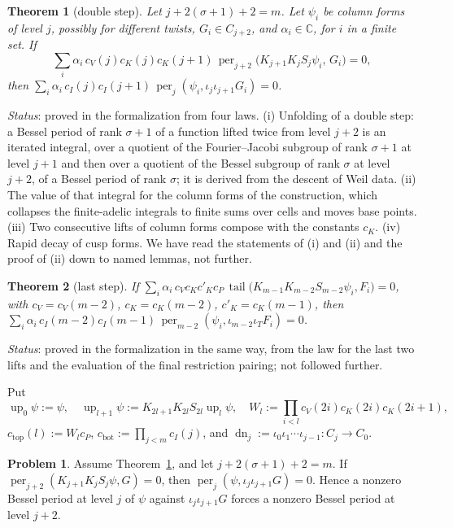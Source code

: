 \documentclass[reqno]{amsart}
\theoremstyle{definition}
\newtheorem{problem}{Problem}[section]
\theoremstyle{plain}
\newtheorem{theorem}{Theorem}[section]
\theoremstyle{remark}
\newcommand{\C}{\mathbb C}
\newcommand{\per}{\operatorname{per}}
\newcommand{\tail}{\operatorname{tail}}
\newcommand{\up}{\operatorname{up}}
\newcommand{\dn}{\operatorname{dn}}
\newcommand{\cTop}{c_{\mathrm{top}}}
\newcommand{\cBot}{c_{\mathrm{bot}}}
\begin{document}
\begin{theorem}[double step]\label{thm:step}
Let \(j+2(\sigma+1)+2=m\).  Let \(\psi_i\) be column forms of level \(j\), possibly for different twists, \(G_i\in C_{j+2}\), and \(\alpha_i\in\C\), for \(i\) in a finite set.  If
\[
 \sum_i\alpha_i\,c_V(j)c_K(j)c_K(j+1)\,\per_{j+2}\bigl(K_{j+1}K_jS_j\psi_i,\,G_i\bigr)=0,
\]
then \(\sum_i\alpha_i\,c_I(j)c_I(j+1)\,\per_j(\psi_i,\iota_j\iota_{j+1}G_i)=0\).
\end{theorem}
\noindent\emph{Status}: proved in the formalization from four laws.  (i) Unfolding of a double step: a Bessel period of rank \(\sigma+1\) of a function lifted twice from level \(j+2\) is an iterated integral, over a quotient of the Fourier--Jacobi subgroup of rank \(\sigma+1\) at level \(j+1\) and then over a quotient of the Bessel subgroup of rank \(\sigma\) at level \(j+2\), of a Bessel period of rank \(\sigma\); it is derived from the descent of Weil data.  (ii) The value of that integral for the column forms of the construction, which collapses the finite-adelic integrals to finite sums over cells and moves base points.  (iii) Two consecutive lifts of column forms compose with the constants \(c_K\).  (iv) Rapid decay of cusp forms.  We have read the statements of (i) and (ii) and the proof of (ii) down to named lemmas, not further.

\begin{theorem}[last step]\label{thm:last}
If \(\sum_i\alpha_i\,c_V c_K c'_K c_P\,\tail\bigl(K_{m-1}K_{m-2}S_{m-2}\psi_i,F_i\bigr)=0\), with \(c_V=c_V(m-2)\), \(c_K=c_K(m-2)\), \(c'_K=c_K(m-1)\), then \(\sum_i\alpha_i\,c_I(m-2)c_I(m-1)\,\per_{m-2}(\psi_i,\iota_{m-2}\iota_TF_i)=0\).
\end{theorem}
\noindent\emph{Status}: proved in the formalization in the same way, from the law for the last two lifts and the evaluation of the final restriction pairing; not followed further.

Put
\[
 \up_0\psi:=\psi,\quad \up_{l+1}\psi:=K_{2l+1}K_{2l}S_{2l}\up_l\psi,\quad
 W_l:=\prod_{i<l}c_V(2i)c_K(2i)c_K(2i+1),
\]
\(\cTop(l):=W_lc_P\), \(\cBot:=\prod_{j<m}c_I(j)\), and \(\dn_j:=\iota_0\iota_1\cdots\iota_{j-1}\colon C_j\to C_0\).

\begin{problem}\label{pr:vanish}
Assume Theorem~\ref{thm:step}, and let \(j+2(\sigma+1)+2=m\).  If \(\per_{j+2}(K_{j+1}K_jS_j\psi,G)=0\), then \(\per_j(\psi,\iota_j\iota_{j+1}G)=0\).  Hence a nonzero Bessel period at level \(j\) of \(\psi\) against \(\iota_j\iota_{j+1}G\) forces a nonzero Bessel period at level \(j+2\).
\end{problem}
\end{document}
